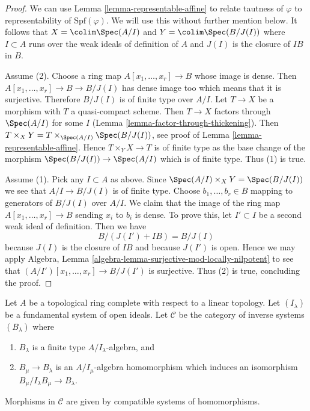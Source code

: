 \begin{proof}
We can use Lemma \ref{lemma-representable-affine} to relate tautness of
$\varphi$ to representability of $\text{Spf}(\varphi)$. We will use this
without further mention below. It follows that $X = \colim \Spec(A/I)$
and $Y = \colim \Spec(B/J(I))$ where $I \subset A$ runs over the weak
ideals of definition of $A$ and $J(I)$ is the closure of $IB$ in $B$.

\medskip\noindent
Assume (2).
Choose a ring map $A[x_1, \ldots, x_r] \to B$ whose image is dense.
Then $A[x_1, \ldots, x_r] \to B \to B/J(I)$ has dense image too
which means that it is surjective. Therefore $B/J(I)$ is of
finite type over $A/I$. Let $T \to X$ be a morphism with
$T$ a quasi-compact scheme. Then $T \to X$ factors through
$\Spec(A/I)$ for some $I$ (Lemma \ref{lemma-factor-through-thickening}).
Then $T \times_X Y = T \times_{\Spec(A/I)} \Spec(B/J(I))$, see proof of
Lemma \ref{lemma-representable-affine}.
Hence $T \times_Y X \to T$ is of finite type as the base change of
the morphism $\Spec(B/J(I)) \to \Spec(A/I)$ which is of finite
type. Thus (1) is true.

\medskip\noindent
Assume (1). Pick any $I \subset A$ as above. Since
$\Spec(A/I) \times_X Y = \Spec(B/J(I))$ we see that $A/I \to B/J(I)$
is of finite type. Choose $b_1, \ldots, b_r \in B$
mapping to generators of $B/J(I)$ over $A/I$. We claim that the image
of the ring map $A[x_1, \ldots, x_r] \to B$ sending $x_i$ to $b_i$
is dense. To prove this, let $I' \subset I$ be a second weak ideal
of definition. Then we have
$$
B/(J(I') + IB) = B/J(I)
$$
because $J(I)$ is the closure of $IB$ and because $J(I')$ is open.
Hence we may apply Algebra, Lemma
\ref{algebra-lemma-surjective-mod-locally-nilpotent}
to see that $(A/I')[x_1, \ldots, x_r] \to B/J(I')$ is surjective.
Thus (2) is true, concluding the proof.
\end{proof}

\noindent
Let $A$ be a topological ring complete with respect to a linear
topology. Let $(I_\lambda)$ be a fundamental system of open ideals.
Let $\mathcal{C}$ be the category of inverse systems $(B_\lambda)$ where
\begin{enumerate}
\item $B_\lambda$ is a finite type $A/I_\lambda$-algebra, and
\item $B_\mu \to B_\lambda$ is an $A/I_\mu$-algebra homomorphism
which induces an isomorphism $B_\mu/I_\lambda B_\mu \to B_\lambda$.
\end{enumerate}
Morphisms in $\mathcal{C}$ are given by compatible systems of homomorphisms.

